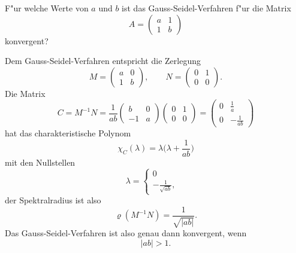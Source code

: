 F"ur welche Werte von $a$ und $b$ ist das Gauss-Seidel-Verfahren f"ur die
Matrix
\[
A=\begin{pmatrix}
a&1\\
1&b
\end{pmatrix}
\]
konvergent?

\begin{loesung}
Dem Gauss-Seidel-Verfahren entspricht die Zerlegung
\[
M=\begin{pmatrix}a&0\\1&b\end{pmatrix},\qquad
N=\begin{pmatrix}0&1\\0&0\end{pmatrix}.
\]
Die Matrix
\[
C=M^{-1}N
=
\frac1{ab}
\begin{pmatrix}b&0\\-1&a\end{pmatrix}
\begin{pmatrix}0&1\\0&0\end{pmatrix}
=
\begin{pmatrix}
0&\frac1a\\0&-\frac1{ab}
\end{pmatrix}
\]
hat das charakteristische Polynom
\[
\chi_C(\lambda)=\lambda\biggl(\lambda +\frac1{ab}\biggr)
\]
mit den Nullstellen
\[
\lambda=\begin{cases}
0&\\
\displaystyle
-\frac1{\sqrt{ab}},&
\end{cases}
\]
der Spektralradius ist also
\[
\varrho(M^{-1}N)=\frac1{\sqrt{|ab|}}.
\]
Das Gauss-Seidel-Verfahren ist also genau dann konvergent, wenn
\[
|ab| > 1.
\]
\end{loesung}

